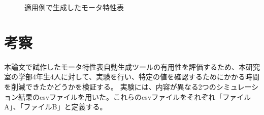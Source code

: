 \documentclass[uplatex, 10pt, a4p]{jsarticle}
\begin{document}
\begin{figure}[t]
	\centering
    \caption{適用例で生成したモータ特性表}
	\label{fig:tekiyou_mortoku}
\end{figure}

\section{考察}\label{sec:Evaluation}
本論文で試作したモータ特性表自動生成ツールの有用性を評価するため、本研究室の学部4年生4人に対して、実験を行い、特定の値を確認するためにかかる時間を削減できたかどうかを検証する。
実験には、内容が異なる2つのシミュレーション結果のcsvファイルを用いた。これらのcsvファイルをそれぞれ「ファイルA」、「ファイルB」と定義する。
\end{document}
